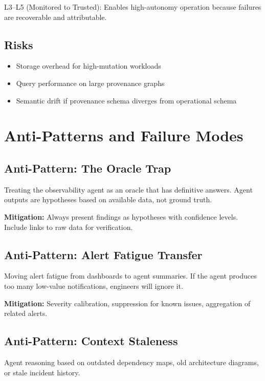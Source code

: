 L3--L5 (Monitored to Trusted): Enables high-autonomy operation because failures are recoverable and attributable.

\subsection{Risks}

\begin{itemize}
    \item Storage overhead for high-mutation workloads
    \item Query performance on large provenance graphs
    \item Semantic drift if provenance schema diverges from operational schema
\end{itemize}

\section{Anti-Patterns and Failure Modes}
\label{sec:observability-antipatterns}

\subsection{Anti-Pattern: The Oracle Trap}

Treating the observability agent as an oracle that has definitive answers. Agent outputs are hypotheses based on available data, not ground truth.

\textbf{Mitigation:} Always present findings as hypotheses with confidence levels. Include links to raw data for verification.

\subsection{Anti-Pattern: Alert Fatigue Transfer}

Moving alert fatigue from dashboards to agent summaries. If the agent produces too many low-value notifications, engineers will ignore it.

\textbf{Mitigation:} Severity calibration, suppression for known issues, aggregation of related alerts.

\subsection{Anti-Pattern: Context Staleness}

Agent reasoning based on outdated dependency maps, old architecture diagrams, or stale incident history.

